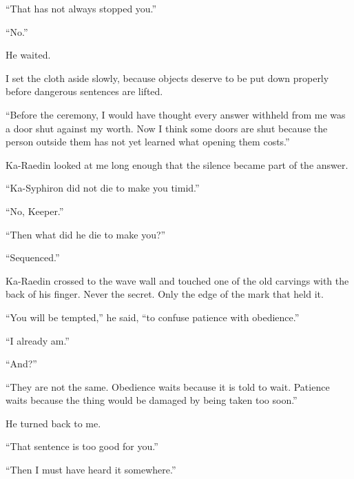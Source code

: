 ``That has not always stopped you.''\par

``No.''\par

He waited.\par

I set the cloth aside slowly, because objects deserve to be put down properly before dangerous sentences are lifted.\par

``Before the ceremony, I would have thought every answer withheld from me was a door shut against my worth. Now I think some doors are shut because the person outside them has not yet learned what opening them costs.''\par

Ka-Raedin looked at me long enough that the silence became part of the answer.\par

``Ka-Syphiron did not die to make you timid.''\par

``No, Keeper.''\par

``Then what did he die to make you?''\par

``Sequenced.''\par

Ka-Raedin crossed to the wave wall and touched one of the old carvings with the back of his finger. Never the secret. Only the edge of the mark that held it.\par

``You will be tempted,'' he said, ``to confuse patience with obedience.''\par

``I already am.''\par

``And?''\par

``They are not the same. Obedience waits because it is told to wait. Patience waits because the thing would be damaged by being taken too soon.''\par

He turned back to me.\par

``That sentence is too good for you.''\par

``Then I must have heard it somewhere.''\par

